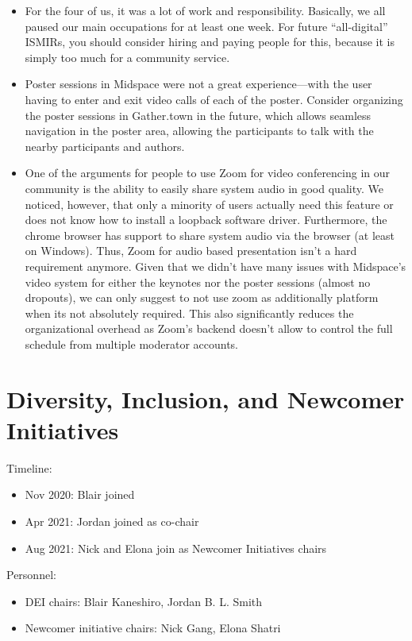 \documentclass[%
10pt,								%
titlepage,						%
]
{scrartcl}
\begin{document}
\begin{itemize}
            \item For the four of us, it was a lot of work and responsibility. Basically, we all paused our main occupations for at least one week. For future ``all-digital'' ISMIRs, you should consider hiring and paying people for this, because it is simply too much for a community service.
            \item Poster sessions in Midspace were not a great experience---with the user having to enter and exit video calls of each of the poster. Consider organizing the poster sessions in Gather.town in the future, which allows seamless navigation in the poster area, allowing the participants to talk with the nearby participants and authors.
            \item One of the arguments for people to use Zoom for video conferencing in our community is the ability to easily share system audio in good quality. We noticed, however, that only a minority of users actually need this feature or does not know how to install a loopback software driver. Furthermore, the chrome browser has support to share system audio via the browser (at least on Windows). Thus, Zoom for audio based presentation isn't a hard requirement anymore. Given that we didn't have many issues with Midspace's video system for either the keynotes nor the poster sessions (almost no dropouts), we can only suggest to not use zoom as additionally platform when its not absolutely required. This also significantly reduces the organizational overhead as Zoom's backend doesn't allow to control the full schedule from multiple moderator accounts.
        \end{itemize}

\section{Diversity, Inclusion, and Newcomer Initiatives}
    Timeline:
    \begin{itemize}
        \item   Nov 2020: Blair joined 
        \item   Apr 2021: Jordan joined as co-chair
        \item   Aug 2021: Nick and Elona join as Newcomer Initiatives chairs
    \end{itemize}
    
    Personnel:
    \begin{itemize}
        \item   DEI chairs: Blair Kaneshiro, Jordan B. L. Smith
        \item   Newcomer initiative chairs: Nick Gang, Elona Shatri
    \end{itemize}
    
\end{document}
